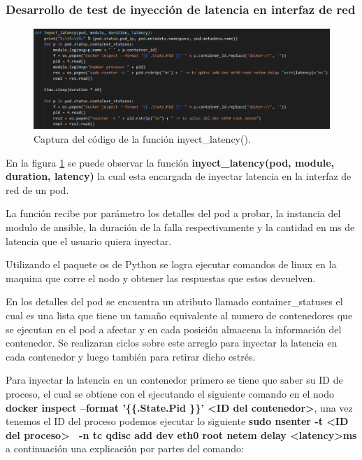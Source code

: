 \subsubsection{Desarrollo de test de inyección de latencia en interfaz de red}

\begin{figure}[htpb!]
	\centering
	\includegraphics[width=0.95\columnwidth]{images/captures/codigo/Capture_inyect_latency.PNG}
	\caption{Captura del código de la función inyect\_latency().}
	\label{fig:codi02}
\end{figure}

\par En la figura \ref{fig:codi02} se puede observar la función \textbf{ inyect\_latency(pod, module, duration, latency)} la cual esta encargada de inyectar latencia en la interfaz de red de un pod.\\

\par La función recibe por parámetro los detalles del pod a probar, la instancia del modulo de ansible, la duración de la falla respectivamente y la cantidad en ms de latencia que el usuario quiera inyectar. \\

\par Utilizando el paquete os de Python se logra ejecutar comandos de linux en la maquina que corre el nodo y obtener las respuestas que estos devuelven. \\

\par En los detalles del pod se encuentra un atributo llamado container\_statuses el cual es una lista que tiene un tamaño equivalente al numero de contenedores que se ejecutan en el pod a afectar y en cada posición almacena la información del contenedor. Se realizaran ciclos sobre este arreglo para inyectar la latencia en cada contenedor y luego también para retirar dicho estrés.\\

\par Para inyectar la latencia en un contenedor primero se tiene que saber su ID de proceso, el cual se obtiene con el ejecutando el siguiente comando en el nodo \textbf{docker inspect --format '\{\{.State.Pid \}\}' <ID del contenedor>}, una vez tenemos el ID del proceso podemos ejecutar lo siguiente \textbf{sudo nsenter -t <ID del proceso> \ -n tc qdisc add dev eth0 root netem delay <latency>ms} a continuación una explicación por partes del comando:


